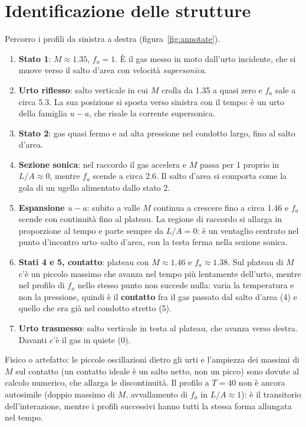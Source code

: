 \documentclass[11pt,a4paper]{article}
\newcommand{\uma}{u-a}
\newcommand{\fa}{f_a}
\begin{document}
\section{Identificazione delle strutture}
Percorro i profili da sinistra a destra (figura~\ref{fig:annotate}).
\begin{enumerate}
  \item \textbf{Stato 1}: $M\approx\num{1.35}$, $\fa=1$. È il gas messo in moto dall'urto incidente, che si
    muove verso il salto d'area con velocità \emph{supersonica}.
  \item \textbf{Urto riflesso}: salto verticale in cui $M$ crolla da \num{1.35} a quasi zero e $\fa$ sale a circa
    \num{5.3}. La sua posizione si sposta verso sinistra con il tempo: è un urto della famiglia $\uma$, che
    risale la corrente supersonica.
  \item \textbf{Stato 2}: gas quasi fermo e ad alta pressione nel condotto largo, fino al salto d'area.
  \item \textbf{Sezione sonica}: nel raccordo il gas accelera e $M$ passa per 1 proprio in $L/A\approx0$, mentre
    $\fa$ scende a circa \num{2.6}. Il salto d'area si comporta come la gola di un ugello alimentato dallo stato 2.
  \item \textbf{Espansione $\uma$}: subito a valle $M$ continua a crescere fino a circa \num{1.46} e $\fa$ scende
    con continuità fino al plateau. La regione di raccordo si allarga in proporzione al tempo e parte sempre da
    $L/A=0$: è un ventaglio centrato nel punto d'incontro urto--salto d'area, con la testa ferma nella sezione
    sonica.
  \item \textbf{Stati 4 e 5, contatto}: plateau con $M\approx\num{1.46}$ e $\fa\approx\num{1.38}$. Sul plateau di $M$
    c'è un piccolo massimo che avanza nel tempo più lentamente dell'urto, mentre nel profilo di $\fa$ nello
    stesso punto non succede nulla: varia la temperatura e non la pressione, quindi è il \textbf{contatto} fra
    il gas passato dal salto d'area (4) e quello che era già nel condotto stretto (5).
  \item \textbf{Urto trasmesso}: salto verticale in testa al plateau, che avanza verso destra. Davanti c'è il gas
    in quiete (0).
\end{enumerate}
Fisico o artefatto: le piccole oscillazioni dietro gli urti e l'ampiezza dei massimi di $M$ sul contatto
(un contatto ideale è un salto netto, non un picco) sono dovute al calcolo numerico, che allarga le
discontinuità. Il profilo a $T=40$ non è ancora autosimile (doppio massimo di $M$, avvallamento di $\fa$ in
$L/A\approx1$): è il transitorio dell'interazione, mentre i profili successivi hanno tutti la stessa forma
allungata nel tempo.
\end{document}
